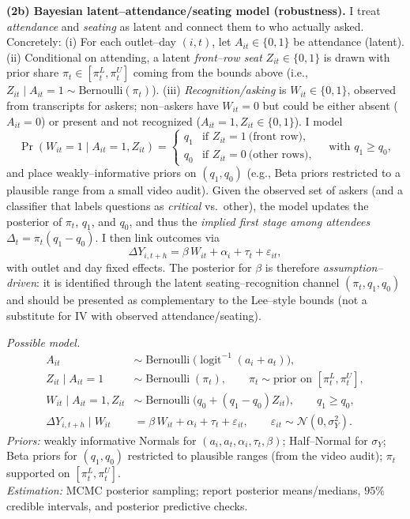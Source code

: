 \documentclass[11pt]{article}
\begin{document}
\textbf{(2b) Bayesian latent–attendance/seating model (robustness).}
I treat \emph{attendance} and \emph{seating} as latent and connect them to who actually asked. Concretely:
(i) For each outlet–day $(i,t)$, let $A_{it}\in\{0,1\}$ be attendance (latent).
(ii) Conditional on attending, a latent \emph{front–row seat} $Z_{it}\in\{0,1\}$ is drawn with prior share $\pi_t\in[\pi_t^L,\pi_t^U]$ coming from the bounds above (i.e., $Z_{it}\mid A_{it}{=}1\sim \mathrm{Bernoulli}(\pi_t)$).
(iii) \emph{Recognition/asking} is $W_{it}\in\{0,1\}$, observed from transcripts for askers; non–askers have $W_{it}=0$ but could be either absent ($A_{it}=0$) or present and not recognized ($A_{it}=1, Z_{it}\in\{0,1\}$). I model
\[
\Pr(W_{it}{=}1\mid A_{it}{=}1,Z_{it})=\begin{cases}
q_1 & \text{if } Z_{it}=1\ \text{(front row)},\\
q_0 & \text{if } Z_{it}=0\ \text{(other rows)},
\end{cases}
\quad\text{with } q_1\ge q_0,
\]
and place weakly–informative priors on $(q_1,q_0)$ (e.g., Beta priors restricted to a plausible range from a small video audit).
Given the observed set of askers (and a classifier that labels questions as \emph{critical} vs.\ other), the model updates the posterior of $\pi_t$, $q_1$, and $q_0$, and thus the \emph{implied first stage among attendees} $\Delta_t=\pi_t(q_1-q_0)$. I then link outcomes via
\[
\Delta Y_{i,t+h}=\beta\,W_{it}+\alpha_i+\tau_t+\varepsilon_{it},
\]
with outlet and day fixed effects. The posterior for $\beta$ is therefore \emph{assumption–driven}: it is identified through the latent seating–recognition channel $(\pi_t,q_1,q_0)$ and should be presented as complementary to the Lee–style bounds (not a substitute for IV with observed attendance/seating).

\medskip
\noindent\textit{Possible model.}
\[
\begin{aligned}
A_{it} &\sim \operatorname{Bernoulli}\!\big(\operatorname{logit}^{-1}(a_i+a_t)\big),\\
Z_{it}\mid A_{it}{=}1 &\sim \operatorname{Bernoulli}(\pi_t), \qquad \pi_t \sim \text{prior on }[\pi_t^L,\pi_t^U],\\
W_{it}\mid A_{it}{=}1,Z_{it} &\sim \operatorname{Bernoulli}\!\big(q_0 + (q_1{-}q_0)Z_{it}\big), \qquad q_1 \ge q_0,\\
\Delta Y_{i,t+h}\mid W_{it} &= \beta\,W_{it} + \alpha_i + \tau_t + \varepsilon_{it}, \qquad \varepsilon_{it}\sim\mathcal N(0,\sigma_Y^2).
\end{aligned}
\]
\noindent\textit{Priors:} weakly informative Normals for $(a_i,a_t,\alpha_i,\tau_t,\beta)$; Half–Normal for $\sigma_Y$; Beta priors for $(q_1,q_0)$ restricted to plausible ranges (from the video audit); $\pi_t$ supported on $[\pi_t^L,\pi_t^U]$.\\
\textit{Estimation:} MCMC posterior sampling; report posterior means/medians, $95\%$ credible intervals, and posterior predictive checks.
\end{document}
